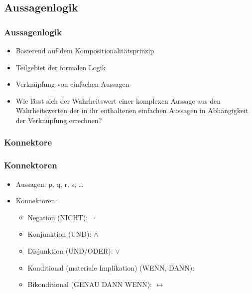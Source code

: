 %
\subsection{Aussagenlogik}


\begin{frame}
\frametitle{Aussagenlogik}

\begin{itemize}
	\item Basierend auf dem Kompositionalitätsprinzip
	\item Teilgebiet der formalen Logik
	\item Verknüpfung von einfachen Aussagen
	\item Wie lässt sich der Wahrheitswert einer komplexen Aussage aus den Wahrheitswerten der in ihr enthaltenen einfachen Aussagen in Abhängigkeit der Verknüpfung errechnen?
\end{itemize}

\end{frame}



\subsubsection{Konnektore}

\begin{frame}
\frametitle{Konnektoren}

\begin{itemize}
	\item Aussagen: p, q, r, s, \dots
	\item Konnektoren:
	
	\begin{itemize}
		\item Negation (NICHT): $\lnot$
		
		\item Konjunktion (UND): $\land$
		
		\item Disjunktion (UND/ODER): $\lor$
		
		\item Konditional (materiale Implikation) (WENN, DANN): \ras
		
		\item Bikonditional (GENAU DANN WENN): $\leftrightarrow$
	\end{itemize}
	
\end{itemize}

\end{frame}


